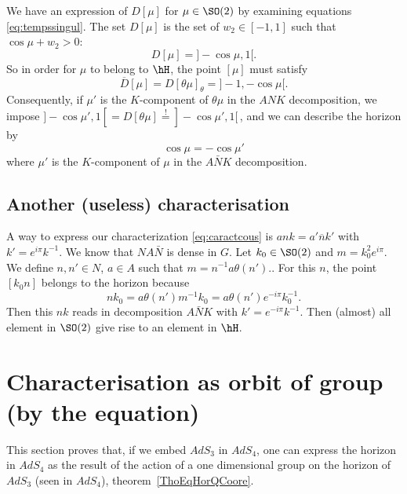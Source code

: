 We have an expression of $D[\mu]$ for $\mu\in \SO(2)$ by examining equations \eqref{eq:tempssingul}. The set $D[\mu]$ is the set of $w_2\in [-1,1]$ such that $\cos \mu+w_2>0$:
\begin{equation}
	D[\mu]=]-\cos \mu,1[.
\end{equation}
So in order for $\mu$ to belong to $\hH$, the point $[\mu]$ must satisfy
\[
\overline{D}[\mu]=D[\theta \mu]_{\theta}=]-1,-\cos \mu[.
	\]
	Consequently, if $\mu'$ is the $K$-component of $\theta \mu$ in the $ANK$ decomposition, we impose $]-\cos \mu',1[=D[\theta \mu]\stackrel{!}{=}]-\cos \mu',1[$\,, and we can describe the horizon by
	\begin{equation} \label{eq:caractcous}
		\cos \mu=-\cos \mu'
	\end{equation}
	where $\mu'$ is the $K$-component of $\mu$ in the $A\bar{N}K$ decomposition.


	\subsection{Another (useless) characterisation}

	A way to express our characterization \eqref{eq:caractcous} is $ank=a'\overline{n}k'$ with $k'=e^{i\pi}k^{-1}$. We know that $NA\bar{N}$ is dense in $G$. Let $k_0\in \SO(2)$ and $m=k_0^2e^{i\pi}$. We define $n,n'\in N$, $a\in A$ such that $m=n^{-1} a\theta(n')$.. For this $n$, the point $[k_0n]$ belongs to the horizon because
	\begin{equation}
		nk_0=a\theta(n')m^{-1} k_0
		=a\theta(n')e^{-i\pi}k_0^{-1}.
	\end{equation}
	Then this $nk$ reads in decomposition $A\bar{N}K$ with $k'=e^{-i\pi}k^{-1}$. Then (almost) all element in $\SO(2)$ give rise to an element in $\hH$.


	\section{Characterisation as orbit of group (by the equation)}
	\label{SecHOrOrbEquation}

	This section proves that, if we embed $AdS_3$ in $AdS_4$, one can express the horizon in $AdS_4$ as the result of the action of a one dimensional group on the horizon of $AdS_3$ (seen in $AdS_4$), theorem~\ref{ThoEqHorQCoore}.

